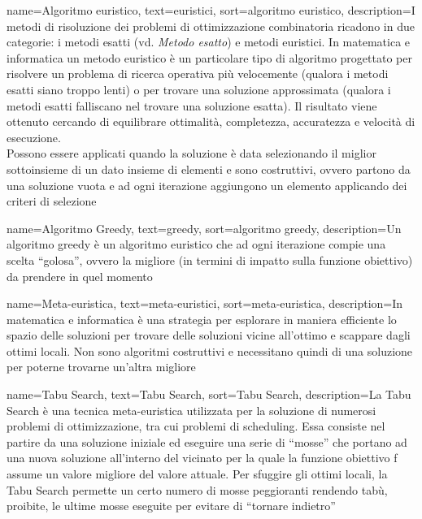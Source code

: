 {
    name=Algoritmo euristico,
    text=euristici,
    sort=algoritmo euristico,
    description={I metodi di risoluzione dei problemi di ottimizzazione combinatoria ricadono in due categorie: i metodi esatti (vd. \textit{Metodo esatto}) e metodi euristici. In matematica e informatica un metodo euristico è un particolare tipo di algoritmo progettato per risolvere un problema di ricerca operativa più velocemente (qualora i metodi esatti siano troppo lenti) o per trovare una soluzione approssimata (qualora i metodi esatti falliscano nel trovare una soluzione esatta). Il risultato viene ottenuto cercando di equilibrare ottimalità, completezza, accuratezza e velocità di esecuzione. \\
    Possono essere applicati quando la soluzione è data selezionando il miglior sottoinsieme di un dato insieme di elementi e sono costruttivi, ovvero partono da una soluzione vuota e ad ogni iterazione aggiungono un elemento applicando dei criteri di selezione \cite{degio:dispensa}}
}

{
    name=Algoritmo Greedy,
    text=greedy,
    sort=algoritmo greedy,
    description={Un algoritmo greedy è un algoritmo euristico che ad ogni iterazione compie una scelta ``golosa'', ovvero la migliore (in termini di impatto sulla funzione obiettivo) da prendere in quel momento}
}

{
    name=Meta-euristica,
    text=meta-euristici,
    sort=meta-euristica,
    description={In matematica e informatica è una strategia per esplorare in maniera efficiente lo spazio delle soluzioni per trovare delle soluzioni vicine all'ottimo e scappare dagli ottimi locali. Non sono algoritmi costruttivi e necessitano quindi di una soluzione per poterne trovarne un'altra migliore}
}

{
    name=Tabu Search,
    text=Tabu Search,
    sort=Tabu Search,
    description={La Tabu Search è una tecnica meta-euristica utilizzata per la soluzione di numerosi problemi di ottimizzazione, tra cui problemi di scheduling. Essa consiste nel partire da una soluzione iniziale ed eseguire una serie di ``mosse'' che portano ad una nuova soluzione all'interno del vicinato per la quale la funzione obiettivo f assume un valore migliore del valore attuale. Per sfuggire gli ottimi locali, la Tabu Search permette un certo numero di mosse peggioranti rendendo tabù, proibite, le ultime mosse eseguite per evitare di ``tornare indietro''}
}

